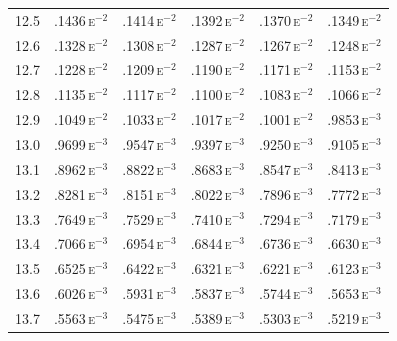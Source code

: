 \begin{minipage}[t]{95mm}
{\begin{tabular}{cccccc}
        12.5           & .1436\,\textsc{e}$^{-2}$ & .1414\,\textsc{e}$^{-2}$ & .1392\,\textsc{e}$^{-2}$ & .1370\,\textsc{e}$^{-2}$ & .1349\,\textsc{e}$^{-2}$ \\
        12.6           & .1328\,\textsc{e}$^{-2}$ & .1308\,\textsc{e}$^{-2}$ & .1287\,\textsc{e}$^{-2}$ & .1267\,\textsc{e}$^{-2}$ & .1248\,\textsc{e}$^{-2}$ \\
        12.7           & .1228\,\textsc{e}$^{-2}$ & .1209\,\textsc{e}$^{-2}$ & .1190\,\textsc{e}$^{-2}$ & .1171\,\textsc{e}$^{-2}$ & .1153\,\textsc{e}$^{-2}$ \\
        12.8           & .1135\,\textsc{e}$^{-2}$ & .1117\,\textsc{e}$^{-2}$ & .1100\,\textsc{e}$^{-2}$ & .1083\,\textsc{e}$^{-2}$ & .1066\,\textsc{e}$^{-2}$ \\
        12.9           & .1049\,\textsc{e}$^{-2}$ & .1033\,\textsc{e}$^{-2}$ & .1017\,\textsc{e}$^{-2}$ & .1001\,\textsc{e}$^{-2}$ & .9853\,\textsc{e}$^{-3}$ \\[1.5ex]
        13.0           & .9699\,\textsc{e}$^{-3}$ & .9547\,\textsc{e}$^{-3}$ & .9397\,\textsc{e}$^{-3}$ & .9250\,\textsc{e}$^{-3}$ & .9105\,\textsc{e}$^{-3}$ \\
        13.1           & .8962\,\textsc{e}$^{-3}$ & .8822\,\textsc{e}$^{-3}$ & .8683\,\textsc{e}$^{-3}$ & .8547\,\textsc{e}$^{-3}$ & .8413\,\textsc{e}$^{-3}$ \\
        13.2           & .8281\,\textsc{e}$^{-3}$ & .8151\,\textsc{e}$^{-3}$ & .8022\,\textsc{e}$^{-3}$ & .7896\,\textsc{e}$^{-3}$ & .7772\,\textsc{e}$^{-3}$ \\
        13.3           & .7649\,\textsc{e}$^{-3}$ & .7529\,\textsc{e}$^{-3}$ & .7410\,\textsc{e}$^{-3}$ & .7294\,\textsc{e}$^{-3}$ & .7179\,\textsc{e}$^{-3}$ \\
        13.4           & .7066\,\textsc{e}$^{-3}$ & .6954\,\textsc{e}$^{-3}$ & .6844\,\textsc{e}$^{-3}$ & .6736\,\textsc{e}$^{-3}$ & .6630\,\textsc{e}$^{-3}$ \\
        13.5           & .6525\,\textsc{e}$^{-3}$ & .6422\,\textsc{e}$^{-3}$ & .6321\,\textsc{e}$^{-3}$ & .6221\,\textsc{e}$^{-3}$ & .6123\,\textsc{e}$^{-3}$ \\
        13.6           & .6026\,\textsc{e}$^{-3}$ & .5931\,\textsc{e}$^{-3}$ & .5837\,\textsc{e}$^{-3}$ & .5744\,\textsc{e}$^{-3}$ & .5653\,\textsc{e}$^{-3}$ \\
        13.7           & .5563\,\textsc{e}$^{-3}$ & .5475\,\textsc{e}$^{-3}$ & .5389\,\textsc{e}$^{-3}$ & .5303\,\textsc{e}$^{-3}$ & .5219\,\textsc{e}$^{-3}$ \\

\end{tabular}}
\end{minipage}
